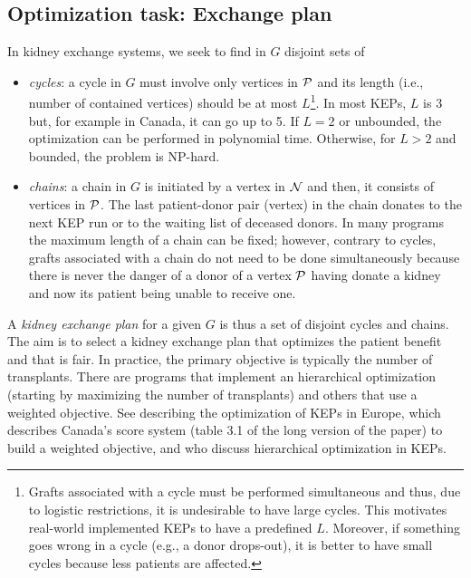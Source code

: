 \documentclass{article}
\begin{document}
\subsection{Optimization task: Exchange plan}\label{subsec:optimizationtask}
In kidney exchange systems, we seek to find in $G$ disjoint sets of
\begin{itemize}
    \item \emph{cycles}: a cycle in $G$ must involve only vertices in $\mathcal{P}$ and its length (i.e., number of contained vertices) should be at most $L$\footnote{Grafts associated with a cycle must be performed simultaneous and thus, due to logistic restrictions, it is undesirable to have large cycles. This motivates real-world implemented KEPs to have a predefined $L$. Moreover, if something goes wrong in a cycle (e.g., a donor drops-out), it is better to have small cycles because less patients are affected.}. In most KEPs, $L$ is 3 but, for example in Canada, it can go up to 5. If $L=2$ or unbounded, the optimization can be performed in polynomial time. Otherwise, for $L>2$ and bounded, the problem is NP-hard.
    \item \emph{chains}:  a chain in $G$ is initiated by a vertex in $\mathcal{N}$ and then, it consists of vertices in $\mathcal{P}$. The last patient-donor pair (vertex) in the chain donates to the next KEP run or to the waiting list of deceased donors. In many programs the maximum length of a chain can be fixed; however, contrary to cycles, grafts associated with a chain do not need to be done simultaneously because there is never the danger of a donor of a vertex $\mathcal{P}$ having donate a kidney and now its patient being unable to receive one. 
\end{itemize}
A \emph{kidney exchange plan} for a given $G$ is thus a set of disjoint cycles and chains. The aim is to select a kidney exchange plan that optimizes the patient benefit and that is fair. In practice, the primary objective is typically the number of transplants. There are programs that implement an hierarchical optimization (starting by maximizing the number of transplants) and others that use a weighted objective. See \cite{biro2019building, biro2021modelling} describing the optimization of KEPs in Europe, \cite{carvalho2023penalties} which describes Canada's score system (table 3.1 of the long version of the paper) to build a weighted objective, and \cite{delorme2024new} who discuss hierarchical optimization in KEPs.
\end{document}
